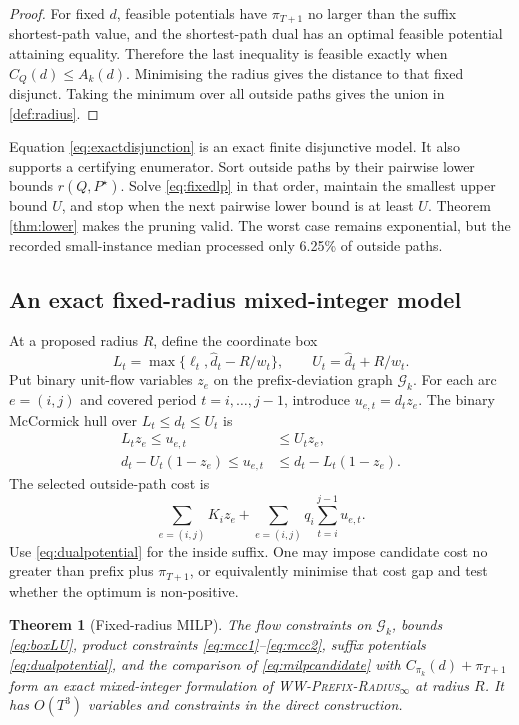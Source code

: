 \documentclass[11pt]{article}
\newtheorem{theorem}{Theorem}[section]
\theoremstyle{definition}
\newcommand{\cG}{\mathcal{G}}
\newcommand{\WWR}{\textsc{WW-Prefix-Radius}\ensuremath{_{\infty}}}
\newcommand{\dhat}{\widehat d}
\newcommand{\ellv}{\ell}
\begin{document}
\begin{proof}
For fixed $d$, feasible potentials have $\pi_{T+1}$ no larger than the suffix shortest-path value, and the shortest-path dual has an optimal feasible potential attaining equality. Therefore the last inequality is feasible exactly when $C_Q(d)\le A_k(d)$. Minimising the radius gives the distance to that fixed disjunct. Taking the minimum over all outside paths gives the union in \cref{def:radius}.
\end{proof}

Equation \eqref{eq:exactdisjunction} is an exact finite disjunctive model. It also supports a certifying enumerator. Sort outside paths by their pairwise lower bounds $r(Q,P^\star)$. Solve \eqref{eq:fixedlp} in that order, maintain the smallest upper bound $U$, and stop when the next pairwise lower bound is at least $U$. Theorem \ref{thm:lower} makes the pruning valid. The worst case remains exponential, but the recorded small-instance median processed only 6.25\% of outside paths.

\subsection{An exact fixed-radius mixed-integer model}

At a proposed radius $R$, define the coordinate box
\begin{equation}\label{eq:boxLU}
L_t=\max\{\ellv_t,\dhat_t-R/w_t\},
\qquad
U_t=\dhat_t+R/w_t.
\end{equation}
Put binary unit-flow variables $z_e$ on the prefix-deviation graph $\cG_k$. For each arc $e=(i,j)$ and covered period $t=i,\ldots,j-1$, introduce $u_{e,t}=d_tz_e$. The binary McCormick hull over $L_t\le d_t\le U_t$ is
\begin{align}
L_tz_e\le u_{e,t}&\le U_tz_e,\label{eq:mcc1}\\
d_t-U_t(1-z_e)\le u_{e,t}&\le d_t-L_t(1-z_e).\label{eq:mcc2}
\end{align}
The selected outside-path cost is
\begin{equation}\label{eq:milpcandidate}
\sum_{e=(i,j)}K_i z_e+
\sum_{e=(i,j)}q_i\sum_{t=i}^{j-1}u_{e,t}.
\end{equation}
Use \eqref{eq:dualpotential} for the inside suffix. One may impose candidate cost no greater than prefix plus $\pi_{T+1}$, or equivalently minimise that cost gap and test whether the optimum is non-positive.

\begin{theorem}[Fixed-radius MILP]\label{thm:milp}
The flow constraints on $\cG_k$, bounds \eqref{eq:boxLU}, product constraints \eqref{eq:mcc1}--\eqref{eq:mcc2}, suffix potentials \eqref{eq:dualpotential}, and the comparison of \eqref{eq:milpcandidate} with $C_{\pi_k}(d)+\pi_{T+1}$ form an exact mixed-integer formulation of \WWR{} at radius $R$. It has $O(T^3)$ variables and constraints in the direct construction.
\end{theorem}
\end{document}
